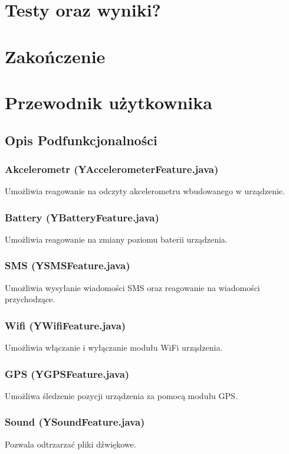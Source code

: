 \documentclass[11pt,a4paper,polish,thesis]{dcsbook}
\begin{document}
\chapter{Testy oraz wyniki?}
\chapter{Zakończenie}

\appendix

\chapter{Przewodnik użytkownika}
\section{Opis Podfunkcjonalności}
\subsection{Akcelerometr (YAccelerometerFeature.java)}
Umożliwia reagowanie na odczyty akcelerometru wbudowanego w urządzenie. 

\subsection{Battery (YBatteryFeature.java)}
Umożliwia reagowanie na zmiany poziomu baterii urządzenia.

\subsection{SMS (YSMSFeature.java)}
Umożliwia wysyłanie wiadomości SMS oraz reagowanie na wiadomości przychodzące.

\subsection{Wifi (YWifiFeature.java)}
Umożliwia włączanie i wyłączanie modułu WiFi urządzenia.

\subsection{GPS (YGPSFeature.java)}
Umożliwa śledzenie pozycji urządzenia za pomocą modułu GPS.

\subsection{Sound (YSoundFeature.java)}
Pozwala odtrzarzać pliki dźwiękowe.
\end{document}
